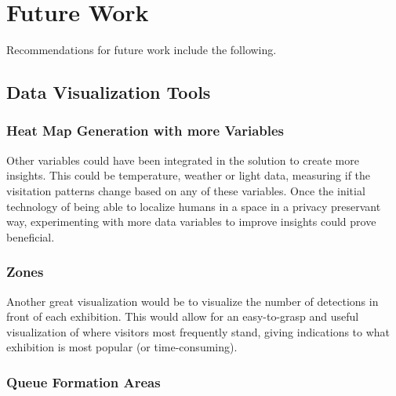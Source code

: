 \section{Future Work}

Recommendations for future work include the following.



\subsection{Data Visualization Tools}

\subsubsection{Heat Map Generation with more Variables}
Other variables could have been integrated in the solution to create more insights. This could be temperature, weather or light data, measuring if the visitation patterns change based on any of these variables. Once the initial technology of being able to localize humans in a space in a privacy preservant way, experimenting with more data variables to improve insights could prove beneficial. 

\subsubsection{Zones}
\label{sec:zones}
Another great visualization would be to visualize the number of detections in front of each exhibition. This would allow for an easy-to-grasp and useful visualization of where visitors most frequently stand, giving indications to what exhibition is most popular (or time-consuming). 

\subsubsection{Queue Formation Areas}
